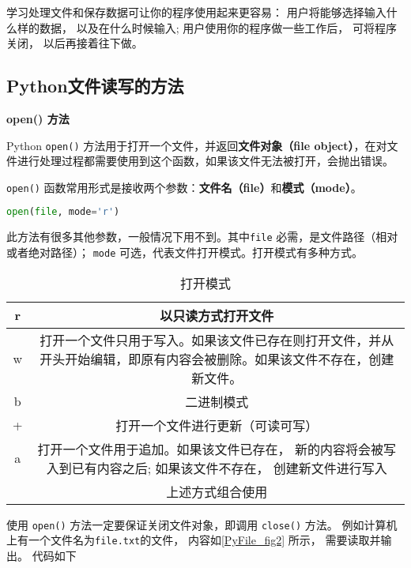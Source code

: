 

学习处理文件和保存数据可让你的程序使用起来更容易： 用户将能够选择输入什么样的数据， 以及在什么时候输入; 用户使用你的程序做一些工作后， 可将程序关闭， 以后再接着往下做。

\subsection{Python文件读写的方法}
\textbf{open() 方法}

Python \verb|open()| 方法用于打开一个文件，并返回\textbf{文件对象（file object）}，在对文件进行处理过程都需要使用到这个函数，如果该文件无法被打开，会抛出错误。

\verb|open()| 函数常用形式是接收两个参数：\textbf{文件名（file）}和\textbf{模式（mode）}。
\begin{lstlisting}[language=python]
open(file, mode='r')
\end{lstlisting}
此方法有很多其他参数，一般情况下用不到。其中\verb|file| 必需，是文件路径（相对或者绝对路径）； \verb|mode| 可选，代表文件打开模式。打开模式有多种方式。
\begin{table}[ht]
\centering
\caption{打开模式}\label{PyFile_tab1}
\begin{tabular}{|c|c|}
\hline
r & 以只读方式打开文件 \\
\hline
w & 打开一个文件只用于写入。如果该文件已存在则打开文件，并从开头开始编辑，即原有内容会被删除。如果该文件不存在，创建新文件。 \\
\hline
b & 二进制模式 \\
\hline
+ & 打开一个文件进行更新（可读可写） \\
\hline
a & 打开一个文件用于追加。如果该文件已存在， 新的内容将会被写入到已有内容之后; 如果该文件不存在， 创建新文件进行写入 \\
\hline
&上述方式组合使用   \\
\hline
\end{tabular}
\end{table}

使用 \verb|open()| 方法一定要保证关闭文件对象，即调用 \verb|close()| 方法。 例如计算机上有一个文件名为\verb|file.txt|的文件， 内容如\autoref{PyFile_fig2} 所示， 需要读取并输出。 代码如下

